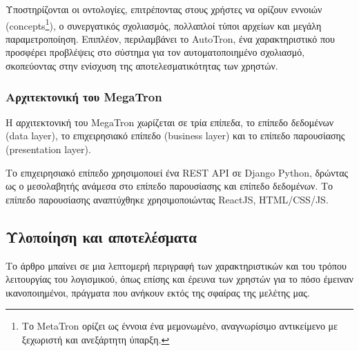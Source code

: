         Υποστηρίζονται οι οντολογίες, επιτρέποντας στους χρήστες να ορίζουν εννοιών (concepts\footnote{Το MetaTron ορίζει ως έννοια ένα μεμονωμένο, αναγνωρίσιμο αντικείμενο με ξεχωριστή και ανεξάρτητη ύπαρξη.}),
            ο συνεργατικός σχολιασμός, πολλαπλοί τύποι αρχείων και μεγάλη παραμετροποίηση.
        Επιπλέον, περιλαμβάνει το AutoTron, ένα χαρακτηριστικό που προσφέρει προβλέψεις στο σύστημα για τον αυτοματοποιημένο σχολιασμό, σκοπεύοντας στην ενίσχυση της αποτελεσματικότητας των χρηστών.

        \subsubsection{Αρχιτεκτονική του MegaTron}
        Η αρχιτεκτονική του MegaTron χωρίζεται σε τρία επίπεδα, το επίπεδο δεδομένων (data layer), το επιχειρησιακό επίπεδο (business layer) και το επίπεδο παρουσίασης (presentation layer).

        Το επιχειρησιακό επίπεδο χρησιμοποιεί ένα REST API σε Django Python, δρώντας ως ο μεσολαβητής ανάμεσα στο επίπεδο παρουσίασης και επίπεδο δεδομένων.
        Το επίπεδο παρουσίασης αναπτύχθηκε χρησιμοποιώντας ReactJS, HTML/CSS/JS.

    \subsection{Υλοποίηση και αποτελέσματα}
        Το άρθρο μπαίνει σε μια λεπτομερή περιγραφή των χαρακτηριστικών και του τρόπου λειτουργίας του λογισμικού, όπως επίσης και έρευνα των χρηστών για το πόσο έμειναν ικανοποιημένοι, πράγματα που ανήκουν εκτός της σφαίρας της μελέτης μας.
